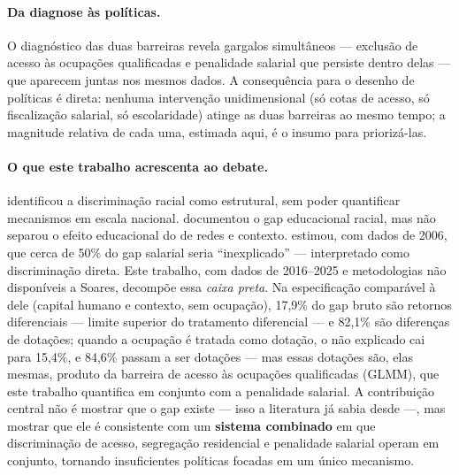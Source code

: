 \documentclass[12pt, a4paper, oneside]{article}
\begin{document}
\paragraph{Da diagnose às políticas.}
O diagnóstico das duas barreiras revela gargalos simultâneos --- exclusão de
acesso às ocupações qualificadas e penalidade salarial que persiste dentro delas
--- que aparecem juntas nos mesmos dados. A consequência para o desenho de políticas
é direta: nenhuma intervenção unidimensional (só cotas de acesso, só fiscalização
salarial, só escolaridade) atinge as duas barreiras ao mesmo tempo; a magnitude
relativa de cada uma, estimada aqui, é o insumo para priorizá-las.

\paragraph{O que este trabalho acrescenta ao debate.}
 identificou a discriminação racial como estrutural,
sem poder quantificar mecanismos em escala nacional.
 documentou o gap educacional racial, mas não separou
o efeito educacional do de redes e contexto.
 estimou, com dados de 2006, que cerca de 50\% do gap
salarial seria ``inexplicado'' --- interpretado como discriminação direta.
Este trabalho, com dados de 2016--2025 e metodologias não disponíveis
a Soares, decompõe essa \textit{caixa preta}. Na especificação comparável à dele
(capital humano e contexto, sem ocupação), 17,9\% do gap bruto são retornos
diferenciais --- limite superior do tratamento diferencial --- e 82,1\% são
diferenças de dotações; quando a ocupação é tratada como dotação, o não explicado
cai para 15,4\%, e 84,6\% passam a ser dotações --- mas essas dotações são, elas mesmas,
produto da barreira de acesso às ocupações qualificadas (GLMM), que este
trabalho quantifica em conjunto com a penalidade salarial.
A contribuição central não é mostrar que o gap existe --- isso a
literatura já sabia desde  ---,
mas mostrar que ele é consistente com um
\textbf{sistema combinado} em que discriminação de acesso, segregação
residencial e penalidade salarial operam em conjunto, tornando
insuficientes políticas focadas em um único mecanismo.
\end{document}
